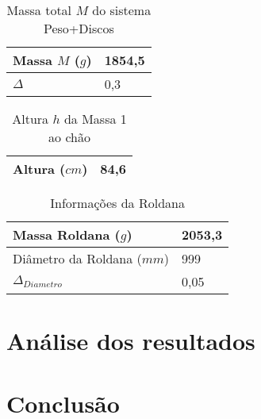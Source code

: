 \documentclass[a4paper]{article}
\begin{document}
\begin{table}[!ht]
	\begin{center}
	\caption{Massa total $M$ do sistema Peso+Discos}
	\begin{tabular}{|l|l|}
	\hline
	\textbf{Massa $M$ ($g$)} & 1854,5\\ \hline
	$\Delta$ & 0,3\\ \hline
	\end{tabular}
	\end{center}
\end{table}

\begin{table}[!ht]
	\begin{center}
	\caption{Altura $h$ da Massa 1 ao chão}
	\begin{tabular}{|l|l|}
	\hline
	Altura ($cm$) & 84,6 \\ \hline
	\end{tabular}
	\end{center}
\end{table}

\begin{table}[!ht]
	\begin{center}
	\caption{Informações da Roldana}
	\begin{tabular}{|l|l|}
	\hline
	Massa Roldana ($g$) & 2053,3 \\ \hline
	Diâmetro da Roldana ($mm$) & 999 \\ \hline
	$\Delta_{Diametro}$ & 0,05	\\ \hline
	\end{tabular}
	\end{center}
\end{table}

\section{Análise dos resultados}

\section{Conclusão}
\end{document}
